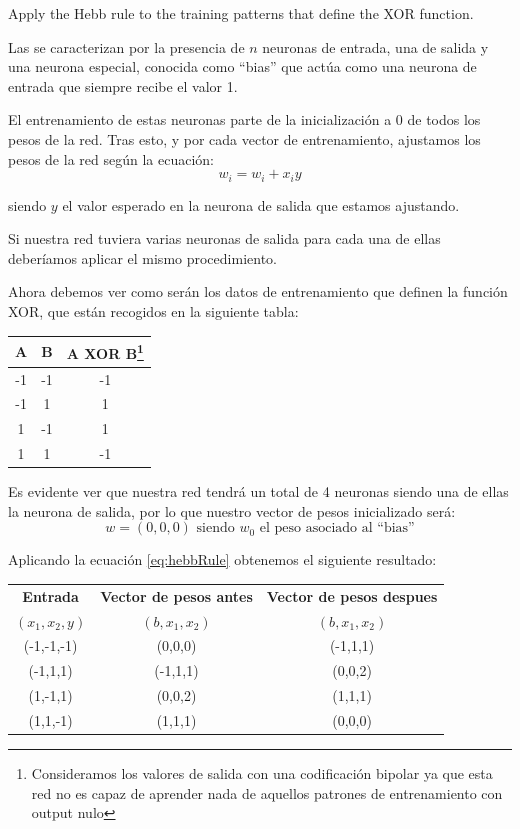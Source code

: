 \begin{problem}[1]
Apply the Hebb rule to the training patterns that define the XOR function.
\solution

Las  se caracterizan por la presencia de $n$ neuronas de entrada, una de salida y una neurona especial, conocida como ``bias'' que actúa como una neurona de entrada que siempre recibe el valor 1.

El entrenamiento de estas neuronas parte de la inicialización a 0 de todos los pesos de la red. Tras esto, y por cada vector de entrenamiento, ajustamos los pesos de la red según la ecuación:
\begin{equation}\label{eq:hebbRule}
w_i=w_i+x_iy
\end{equation}

siendo $y$ el valor esperado en la neurona de salida que estamos ajustando.

Si nuestra red tuviera varias neuronas de salida para cada una de ellas deberíamos aplicar el mismo procedimiento.

Ahora debemos ver como serán los datos de entrenamiento que definen la función XOR, que están recogidos en la siguiente tabla:
\begin{center}
\begin{tabular}{|c|c|c|}
\hline
\textbf{A} & \textbf{B} & \textbf{A XOR B}\footnote{Consideramos los valores de salida con una codificación bipolar ya que esta red no es capaz de aprender nada de aquellos patrones de entrenamiento con output nulo} \\
\hline
-1 & -1 & -1 \\
-1 & 1 & 1 \\
1 & -1 & 1 \\
1 & 1 & -1 \\
\hline
\end{tabular}
\end{center}

Es evidente ver que nuestra red tendrá un total de 4 neuronas siendo una de ellas la neurona de salida, por lo que nuestro vector de pesos inicializado será:
\[w = (0,0,0) \text{ siendo } w_0 \text{ el peso asociado al ``bias''}\]

Aplicando la ecuación \ref{eq:hebbRule} obtenemos el siguiente resultado:
\begin{center}
\begin{tabular}{|c|c|c|}
\hline
\textbf{Entrada} & \textbf{Vector de pesos antes} & \textbf{Vector de pesos despues} \\
$(x_1,x_2,y)$ & $(b,x_1,x_2)$ & $(b,x_1,x_2)$\\
\hline
(-1,-1,-1) & (0,0,0) & (-1,1,1)\\
(-1,1,1) & (-1,1,1) & (0,0,2)\\
(1,-1,1) & (0,0,2) & (1,1,1)\\
(1,1,-1) & (1,1,1) & (0,0,0)\\
\hline
\end{tabular}
\end{center}


\end{problem}
